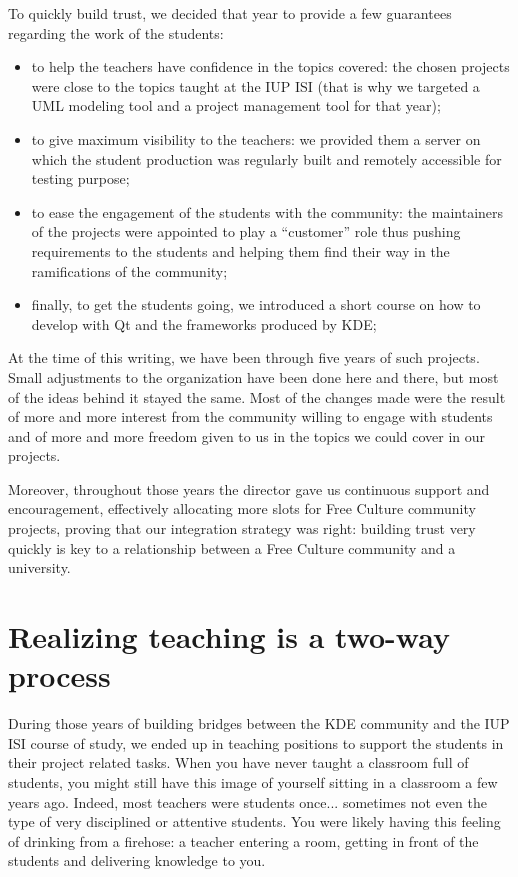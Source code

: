To quickly build trust, we decided that year to provide a few guarantees
regarding the work of the students:
\begin{itemize}
  \item to help the teachers have confidence in the topics covered: the chosen
projects were close to the topics taught at the IUP ISI (that is why we
targeted a UML modeling tool and a project management tool for that year);
  \item to give maximum visibility to the teachers: we provided them a server on
which the student production was regularly built and remotely accessible for
testing purpose;
  \item to ease the engagement of the students with the community: the
maintainers of the projects were appointed to play a ``customer'' role thus
pushing requirements to the students and helping them find their way in the
ramifications of the community;
  \item finally, to get the students going, we introduced a short course on how
to develop with Qt and the frameworks produced by KDE;
\end{itemize}

At the time of this writing, we have been through five years of such projects.
Small adjustments to the organization have been done here and there, but most of
the ideas behind it stayed the same. Most of the changes made were the result of
more and more interest from the community willing to engage with students and
of more and more freedom given to us in the topics we could cover in our
projects.

Moreover, throughout those years the director gave us continuous support and
encouragement, effectively allocating more slots for Free Culture community
projects, proving that our integration strategy was right: building trust very
quickly is key to a relationship between a Free Culture community and a
university.

\section*{Realizing teaching is a two-way process}
During those years of building bridges between the KDE community and the IUP ISI
course of study, we ended up in teaching positions to support the students in
their project related tasks. When you have never taught a classroom
full of students, you might still have this image of yourself sitting in a
classroom a few years ago. Indeed, most teachers were students once... sometimes
not even the type of very disciplined or attentive students. You were likely
having this feeling of drinking from a firehose: a teacher entering a room,
getting in front of the students and delivering knowledge to you.

